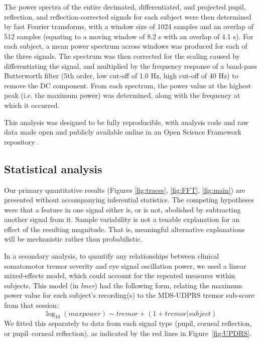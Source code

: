 \documentclass[jou,a4paper]{apa6}
\begin{document}
The power spectra of the entire decimated, differentiated, and projected pupil, reflection, and reflection-corrected signals for each subject were then determined by fast Fourier transforms, with a window size of 1024 samples and an overlap of 512 samples (equating to a moving window of 8.2 s with an overlap of 4.1 s). For each subject, a mean power spectrum across windows was produced for each of the three signals. The spectrum was then corrected for the scaling caused by differentiating the signal, and multiplied by the frequency response of a band-pass Butterworth filter (5th order, low cut-off of 1.0 Hz, high cut-off of 40 Hz) to remove the DC component. From each spectrum, the power value at the highest peak (i.e. the maximum power) was determined, along with the frequency at which it occurred.

This analysis was designed to be fully reproducible, with analysis code and raw data made open and publicly available online in an Open Science Framework repository \citep{Myall2016Investigating-o}.

\subsection{Statistical analysis}
Our primary quantitative results (Figures \ref{fig:traces}, \ref{fig:FFT}, \ref{fig:main}) are presented without accompanying inferential statistics. The competing hypotheses were that a feature in one signal either is, or is not, abolished by subtracting another signal from it. Sample variability is not a tenable explanation for an effect of the resulting magnitude. That is, meaningful alternative explanations will be mechanistic rather than probabilistic.

In a secondary analysis, to quantify any relationships between clinical somatomotor tremor severity and eye signal oscillation power, we used a linear mixed-effects model, which could account for the repeated measures within subjects. This model (in \textit{lmer}) had the following form, relating the maximum power value for each subject's recording(s) to the MDS-UDPRS tremor sub-score from that session: 
\begin{equation}\label{eq:model}
\log_{10} (max power) \sim tremor + (1 + tremor | subject)
\end{equation}
We fitted this separately to data from each signal type (pupil, corneal reflection, or pupil--corneal reflection), as indicated by the red lines in Figure~\ref{fig:UPDRS}.
\end{document}
